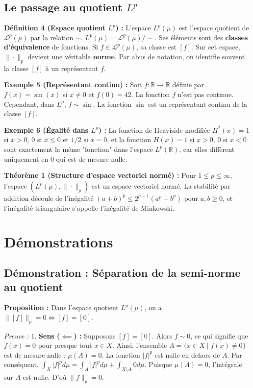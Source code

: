 \documentclass[11pt,a4paper]{article}
\begin{document}
\subsection{Le passage au quotient $L^p$}

\textbf{Définition 4 (Espace quotient $L^p$) :}
L'espace $L^p(\mu)$ est l'espace quotient de $\mathcal{L}^p(\mu)$ par la relation $\sim$.
$L^p(\mu) = \mathcal{L}^p(\mu) / \sim$.
Ses éléments sont des \textbf{classes d'équivalence} de fonctions. Si $f \in \mathcal{L}^p(\mu)$, sa classe est $[f]$.
Sur cet espace, $\| \cdot \|_p$ devient une véritable \textbf{norme}. Par abus de notation, on identifie souvent la classe $[f]$ à un représentant $f$.

\textbf{Exemple 5 (Représentant continu) :} Soit $f : \mathbb{R} \to \mathbb{R}$ définie par $f(x) = \sin(x)$ si $x \neq 0$ et $f(0) = 42$. La fonction $f$ n'est pas continue. Cependant, dans $L^p$, $f \sim \sin$. La fonction $\sin$ est un représentant continu de la classe $[f]$.

\textbf{Exemple 6 (Égalité dans $L^p$) :} La fonction de Heaviside modifiée $H^*(x) = 1$ si $x > 0$, $0$ si $x \le 0$ et $1/2$ si $x=0$, et la fonction $H(x)=1$ si $x>0$, $0$ si $x<0$ sont exactement la même "fonction" dans l'espace $L^p(\mathbb{R})$, car elles diffèrent uniquement en $0$ qui est de mesure nulle.

\textbf{Théorème 1 (Structure d'espace vectoriel normé) :}
Pour $1 \le p \le \infty$, l'espace $(L^p(\mu), \|\cdot\|_p)$ est un espace vectoriel normé.
La stabilité par addition découle de l'inégalité $(a+b)^p \le 2^{p-1}(a^p + b^p)$ pour $a,b \ge 0$, et l'inégalité triangulaire s'appelle l'inégalité de Minkowski.

\section{Démonstrations}

\subsection{Démonstration : Séparation de la semi-norme au quotient}

\textbf{Proposition :} Dans l'espace quotient $L^p(\mu)$, on a $\|[f]\|_p = 0 \iff [f] = [0]$.

\textit{Preuve :}
1. \textbf{Sens ($\impliedby$) :} Supposons $[f] = [0]$. Alors $f \sim 0$, ce qui signifie que $f(x) = 0$ pour presque tout $x \in X$.
Ainsi, l'ensemble $A = \{x \in X \mid f(x) \neq 0\}$ est de mesure nulle : $\mu(A) = 0$.
La fonction $|f|^p$ est nulle en dehors de $A$. Par conséquent, $\int_X |f|^p d\mu = \int_A |f|^p d\mu + \int_{X \setminus A} 0 d\mu$.
Puisque $\mu(A) = 0$, l'intégrale sur $A$ est nulle. D'où $\|f\|_p = 0$.
\end{document}
